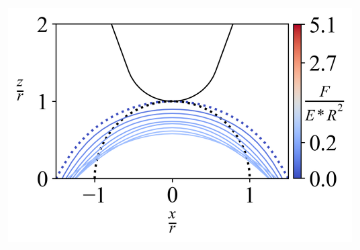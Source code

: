 \begin{figure}[H]
\begin{subfigure}{0.32\textwidth}
        \includegraphics[width=1\linewidth]{Figures/Hemisphere-LineContour-3.png}
    \end{subfigure}



    \hfill
    \vspace{-0.3in}



\end{figure}
